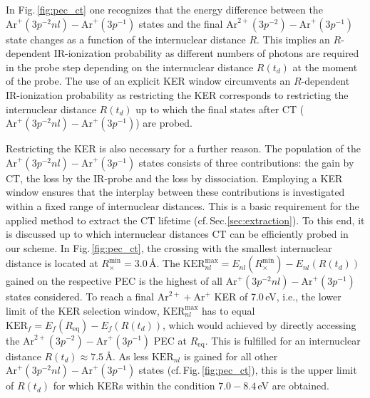 \documentclass[%
 aip,
rsi,%
 amsmath,amssymb,
preprint,%
]{revtex4-1}
\begin{document}
In Fig.\,\ref{fig:pec_ct} one recognizes that the energy difference between the $\mathrm{Ar}^{+}(3p^{-2}nl) - \mathrm{Ar}^{+}(3p^{-1})$ states and the final $\mathrm{Ar}^{2+}(3p^{-2}) - \mathrm{Ar}^{+}(3p^{-1})$ state changes as a function of the internuclear distance $R$. This implies an $R$-dependent IR-ionization probability as different numbers of photons are required in the probe step depending on the internuclear distance $R(t_d)$ at the moment of the probe. The use of an explicit KER window circumvents an $R$-dependent IR-ionization probability as restricting the KER corresponds to restricting the internuclear distance $R(t_d)$ up to which the final states after CT ($\mathrm{Ar}^{+}(3p^{-2}nl) - \mathrm{Ar}^+(3p^{-1})$) are probed. 

Restricting the KER is also necessary for a further reason. The population of the $\mathrm{Ar}^{+}(3p^{-2}nl) - \mathrm{Ar}^{+}(3p^{-1})$ states consists of three contributions: the gain by CT, the loss by the IR-probe and the loss by dissociation. Employing a KER window ensures that the interplay between these contributions is investigated within a fixed range of internuclear distances. This is a basic requirement for the applied method to extract the CT lifetime (cf.\,Sec.\ref{sec:extraction}). To this end, it is discussed up to which internuclear distances CT can be efficiently probed in our scheme. In Fig.\,\ref{fig:pec_ct}, the crossing with the smallest internuclear distance is located at \mbox{$R_{\times}^{\text{min}}=3.0$\,\AA}. The $\mathrm{KER}_{nl}^{\text{max}}  = E_{nl}(R_{\times}^{\text{min}}) - E_{nl}(R(t_d))$ gained on the respective PEC is the highest of all $\mathrm{Ar}^{+}(3p^{-2}nl) - \mathrm{Ar}^+(3p^{-1})$ states considered. To reach a final $\mathrm{Ar}^{2+} + \mathrm{Ar}^+$ KER of 7.0\,eV, i.e., the lower limit of the KER selection window, $\mathrm{KER}_{nl}^{\text{max}}$ has to equal $\mathrm{KER}_f = E_f(R_{\mathrm{eq}}) - E_f(R(t_d))$, which would achieved by directly accessing the $\mathrm{Ar}^{2+}(3p^{-2}) - \mathrm{Ar}^+(3p^{-1})$ PEC at $R_{\mathrm{eq}}$. This is fulfilled for an internuclear distance $R(t_d) \approx 7.5$\,\AA. As less $\mathrm{KER}_{nl}$ is gained for all other $\mathrm{Ar}^{+}(3p^{-2}nl) - \mathrm{Ar}^+(3p^{-1})$ states (cf.\,Fig.\,\ref{fig:pec_ct}), this is the upper limit of $R(t_d)$ for which KERs within the condition $7.0 - 8.4$\,eV are obtained. 
\end{document}

